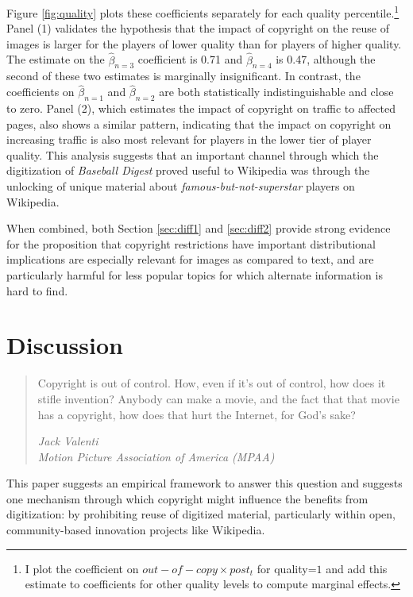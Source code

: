 \documentclass[11pt]{article}
\begin{document}
Figure \ref{fig:quality} plots these coefficients separately for each quality percentile.\footnote{I plot the coefficient on $out-of-copy \times post_t$ for quality=$1$ and add this estimate to coefficients for other quality levels to compute marginal effects.} Panel (1) validates the hypothesis that the impact of copyright on the reuse of images is larger for the players of lower quality than for players of higher quality. The estimate on the $\hat{\beta}_{n=3}$ coefficient is 0.71 and $\hat{\beta}_{n=4}$ is 0.47, although the second of these two estimates is marginally insignificant. In contrast, the coefficients on $\hat{\beta}_{n=1}$ and $\hat{\beta}_{n=2}$ are both statistically indistinguishable and close to zero. Panel (2), which estimates the impact of copyright on traffic to affected pages, also shows a similar pattern, indicating that the impact on copyright on increasing traffic is also most relevant for players in the lower tier of player quality. This analysis suggests that an important channel through which the digitization of \emph{Baseball Digest} proved useful to Wikipedia was through the unlocking of unique material about \emph{famous-but-not-superstar} players on Wikipedia. 

When combined, both Section \ref{sec:diff1} and \ref{sec:diff2} provide strong evidence for the proposition that copyright restrictions have important distributional implications are especially relevant for images as compared to text, and are particularly harmful for less popular topics for which alternate information is hard to find. 

\section{Discussion}
\label{sec:discussion}

\begin{quote}
Copyright is out of control. How, even if it's out of control, how does it stifle invention? Anybody can make a movie, and the fact that that movie has a copyright, how does that hurt the Internet, for God's sake?
\begin{flushright} \emph{Jack Valenti}\\
\emph{Motion Picture Association of America (MPAA)}
\end{flushright}
\end{quote}

This paper suggests an empirical framework to answer this question and suggests one mechanism through which copyright might influence the benefits from digitization: by prohibiting reuse of digitized material, particularly within open, community-based innovation projects like Wikipedia. 
\end{document}
